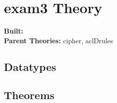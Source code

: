 \documentclass[11pt, twoside]{article}
\begin{document}


\tableofcontents
\cleardoublepage
\HOLpagestyle

\section{exam3 Theory}
\begin{flushleft}
\textbf{Built:} \HOLexamThreeDate \\[2pt]
\textbf{Parent Theories:} cipher, aclDrules
\end{flushleft}

\subsection{Datatypes}

\HOLexamThreeDatatypes


\subsection{Theorems}

\HOLexamThreeTheorems

\HOLindex
\end{document}
